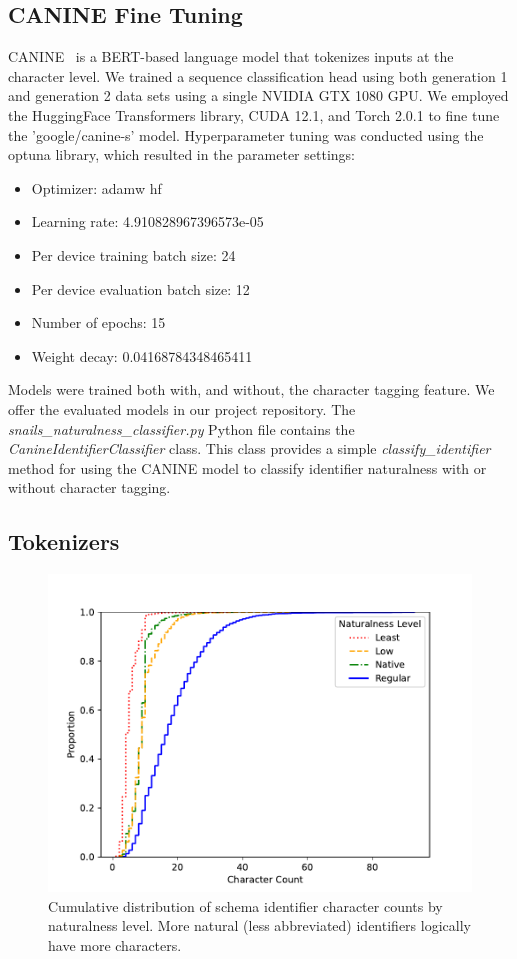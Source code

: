 \subsection{CANINE Fine Tuning}
CANINE~\cite{Clark-2022} is a BERT-based language model that tokenizes inputs at the character level. 
We trained a sequence classification head using both generation 1 and generation 2 data sets using a single NVIDIA GTX 1080 GPU. 
We employed the HuggingFace Transformers library, CUDA 12.1, and Torch 2.0.1 to fine tune the 'google/canine-s' model.
Hyperparameter tuning was conducted using the optuna library, which resulted in the parameter settings:
\begin{itemize}
  \item Optimizer: adamw hf 
  \item Learning rate: 4.910828967396573e-05
  \item Per device training batch size: 24
  \item Per device evaluation batch size: 12
  \item Number of epochs: 15
  \item Weight decay: 0.04168784348465411
\end{itemize}

Models were trained both with, and without, the character tagging feature.
We offer the evaluated models in our project repository.
The \emph{snails\_naturalness\_classifier.py} Python file contains the \emph{CanineIdentifierClassifier} class.
This class provides a simple \emph{classify\_identifier} method for using the CANINE model to classify identifier naturalness with or without character tagging.

\subsection{Tokenizers}

\begin{figure}[ht]
  \centering
  \includegraphics[width=0.5\linewidth]{figures/identifier-char-count-cdf.pdf}
  \caption{Cumulative distribution of schema identifier character counts by naturalness level. More natural (less abbreviated) identifiers logically have more characters.}
  \label{fig:charcountcdf}
\end{figure}

